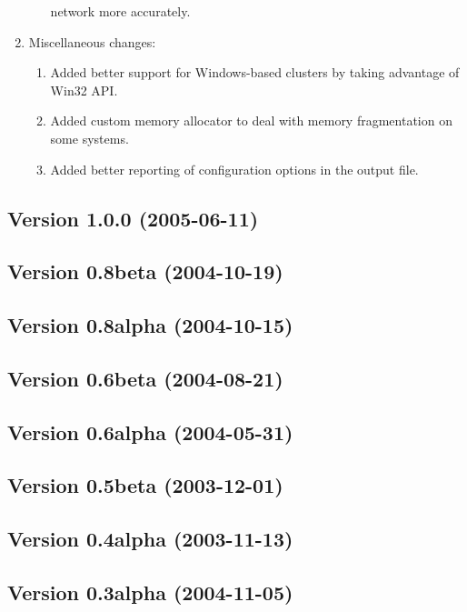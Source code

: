 \documentclass[twocolumn]{article}
\begin{document}
\begin{enumerate}
\begin{enumerate}
   network more accurately.
   \end{enumerate}
\item Miscellaneous changes:
   \begin{enumerate}
   \item Added better support for Windows-based clusters by taking advantage of
   Win32 API.
   \item Added custom memory allocator to deal with memory fragmentation on some
   systems.
   \item Added better reporting of configuration options in the output file.
   \end{enumerate}
\end{enumerate}

\subsection{Version 1.0.0 (2005-06-11)}

\subsection{Version 0.8beta (2004-10-19)}

\subsection{Version 0.8alpha (2004-10-15)}

\subsection{Version 0.6beta (2004-08-21)}

\subsection{Version 0.6alpha (2004-05-31)}

\subsection{Version 0.5beta (2003-12-01)}

\subsection{Version 0.4alpha (2003-11-13)}

\subsection{Version 0.3alpha (2004-11-05)}
\end{document}
